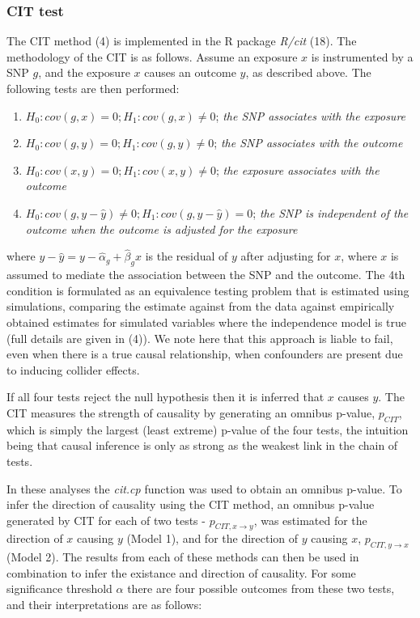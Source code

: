 \documentclass[]{article}
\providecommand{\tightlist}{%
  \setlength{\itemsep}{0pt}\setlength{\parskip}{0pt}}
\begin{document}
\subsubsection{CIT test}\label{cit-test}

The CIT method (4) is implemented in the R package \emph{R/cit} (18).
The methodology of the CIT is as follows. Assume an exposure \(x\) is
instrumented by a SNP \(g\), and the exposure \(x\) causes an outcome
\(y\), as described above. The following tests are then performed:

\begin{enumerate}
\def\labelenumi{\arabic{enumi}.}
\tightlist
\item
  \(H_0: cov(g, x) = 0; H_1: cov(g, x) \neq 0\); \emph{the SNP
  associates with the exposure}
\item
  \(H_0: cov(g, y) = 0; H_1: cov(g, y) \neq 0\); \emph{the SNP
  associates with the outcome}
\item
  \(H_0: cov(x, y) = 0; H_1: cov(x, y) \neq 0\); \emph{the exposure
  associates with the outcome}
\item
  \(H_0: cov(g, y - \hat{y}) \neq 0; H_1: cov(g, y - \hat{y}) = 0\);
  \emph{the SNP is independent of the outcome when the outcome is
  adjusted for the exposure}
\end{enumerate}

where \(y - \hat{y} = y - \hat{\alpha}_g + \hat{\beta}_g x\) is the
residual of \(y\) after adjusting for \(x\), where \(x\) is assumed to
mediate the association between the SNP and the outcome. The 4th
condition is formulated as an equivalence testing problem that is
estimated using simulations, comparing the estimate against from the
data against empirically obtained estimates for simulated variables
where the independence model is true (full details are given in (4)). We
note here that this approach is liable to fail, even when there is a
true causal relationship, when confounders are present due to inducing
collider effects.

If all four tests reject the null hypothesis then it is inferred that
\(x\) causes \(y\). The CIT measures the strength of causality by
generating an omnibus p-value, \(p_{CIT}\), which is simply the largest
(least extreme) p-value of the four tests, the intuition being that
causal inference is only as strong as the weakest link in the chain of
tests.

In these analyses the \emph{cit.cp} function was used to obtain an
omnibus p-value. To infer the direction of causality using the CIT
method, an omnibus p-value generated by CIT for each of two tests -
\(p_{CIT, x \rightarrow y}\), was estimated for the direction of \(x\)
causing \(y\) (Model 1), and for the direction of \(y\) causing \(x\),
\(p_{CIT, y \rightarrow x}\) (Model 2). The results from each of these
methods can then be used in combination to infer the existance and
direction of causality. For some significance threshold \(\alpha\) there
are four possible outcomes from these two tests, and their
interpretations are as follows:
\end{document}
